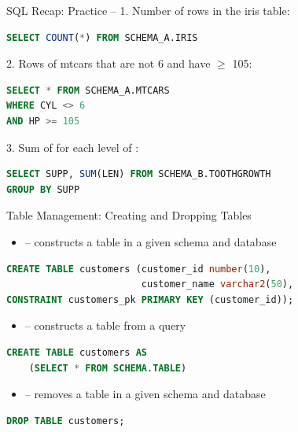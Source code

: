 \documentclass{beamer}
\begin{document}
\begin{frame}[fragile]{SQL Recap: Practice -- }
\small
1. Number of rows in the iris table: 
\begin{lstlisting}[language=SQL]
SELECT COUNT(*) FROM SCHEMA_A.IRIS
\end{lstlisting}
2. Rows of mtcars that are not  6 and have  $\ge$ 105:
\begin{lstlisting}[language=SQL]
SELECT * FROM SCHEMA_A.MTCARS
WHERE CYL <> 6
AND HP >= 105
\end{lstlisting}
3. Sum of  for each level of : 
\begin{lstlisting}[language=SQL]
SELECT SUPP, SUM(LEN) FROM SCHEMA_B.TOOTHGROWTH
GROUP BY SUPP
\end{lstlisting}
\end{frame}

\begin{frame}[fragile]{Table Management: Creating and Dropping Tables}
\begin{itemize}
  \item {} -- constructs a table in a given schema and database
\end{itemize}
\begin{lstlisting}[language=SQL]
CREATE TABLE customers (customer_id number(10),
                        customer_name varchar2(50),
CONSTRAINT customers_pk PRIMARY KEY (customer_id));
\end{lstlisting}
\begin{itemize}
  \item {} -- constructs a table from a query
\end{itemize}
\begin{lstlisting}[language=SQL]
CREATE TABLE customers AS
    (SELECT * FROM SCHEMA.TABLE)
\end{lstlisting}
\begin{itemize}
  \item {} -- removes a table in a given schema and database
\end{itemize}
\begin{lstlisting}[language=SQL]
DROP TABLE customers;
\end{lstlisting}
\end{frame}
\end{document}
